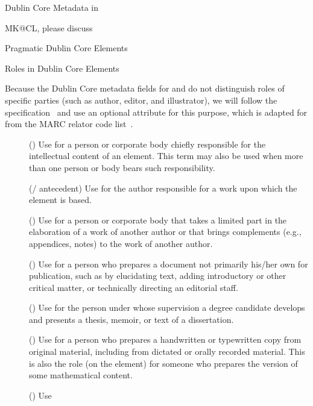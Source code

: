 \begin{module}[id=dc-elements]
\begin{omgroup}[id=dc-elements]{Dublin Core Metadata in {\omdoc}}
\begin{newpart}{MK@CL, please discuss}
\begin{omgroup}{Pragmatic Dublin Core Elements}
\begin{omgroup}[id=dc-roles]{Roles in Dublin Core Elements}

Because the Dublin Core metadata fields for {} and
{} do not distinguish roles of specific parties (such as
author, editor, and illustrator), we will follow the {}
specification~\cite{OpenEBook:oeps99} and use an optional {}
attribute for this purpose, which is adapted for {\omdoc} from the MARC relator code
list~\cite{Marc:relators03}.
\begin{description}
\item[{}] ({}) Use for a
  person or corporate body chiefly responsible for the intellectual
  content of an element. This term may also be used when more than one person or body
  bears such responsibility.
\item[{}]
  (/
  antecedent) Use for the author responsible for a work upon which the element is based.
\item[{}] ({}) Use
  for a person or corporate body that takes a limited part in the elaboration of a
  work of another author or that brings complements (e.g., appendices, notes) to
  the work of another author.
\item[{}] ({}) Use for a
  person who prepares a document not primarily his/her own for publication, such
  as by elucidating text, adding introductory or other critical matter, or
  technically directing an editorial staff.
\item[{}] ({}) Use for the person under
  whose supervision a degree candidate develops and presents a thesis, memoir, or text of
  a dissertation.
\item[{}] ({}) Use
  for a person who prepares a handwritten or typewritten copy from original
  material, including from dictated or orally recorded material. This is also the
  role (on the {} element) for someone who prepares the {\omdoc}
  version of some mathematical content.
\item[{}] ({}) Use

\end{description}
\end{omgroup}
\end{omgroup}
\end{newpart}
\end{omgroup}
\end{module}
